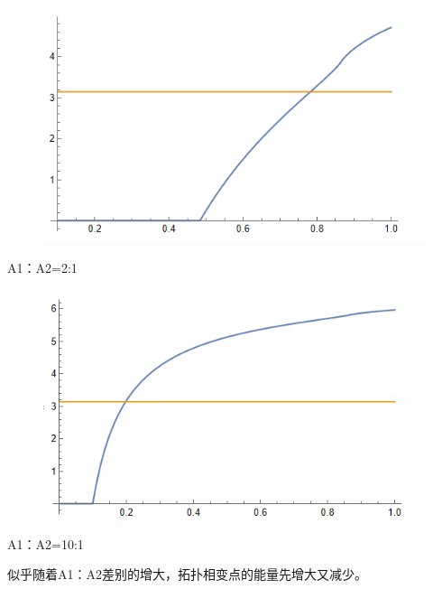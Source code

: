\documentclass[22pt]{article}
\begin{document}
\begin{figure}[H]
	\centering
	\includegraphics[scale=0.5]{Picture/4}
\end{figure}
A1：A2=2:1
\begin{figure}[H]
	\centering
	\includegraphics[scale=0.5]{Picture/5}
\end{figure}
A1：A2=10:1
\par 
似乎随着A1：A2差别的增大，拓扑相变点的能量先增大又减少。
\end{document}

